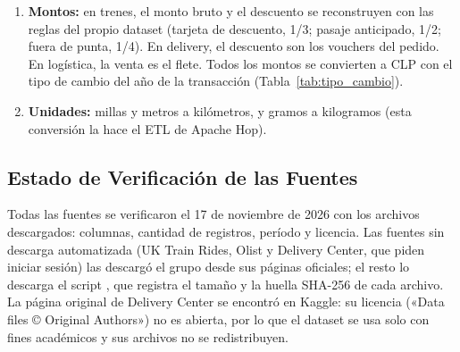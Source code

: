 \begin{enumerate}[leftmargin=*]
        carretera~\cite{sernac2024} se ajustó, por mínimos cuadrados, una
        tarifa por pasaje de 6.918 + 18,8~CLP por km en servicio básico (semi
        cama) y de 6.917 + 26,6~CLP por km en lujo (salón cama). La distancia
        por carretera entre municipios colombianos se estima con la distancia
        en línea recta entre sus coordenadas multiplicada por 1,21, la mediana
        de la razón entre la distancia por carretera y en línea recta de esas
        28 rutas.
  \item \textbf{Montos:} en trenes, el monto bruto y el descuento se
        reconstruyen con las reglas del propio dataset (tarjeta de descuento,
        1/3; pasaje anticipado, 1/2; fuera de punta, 1/4). En delivery, el
        descuento son los vouchers del pedido. En logística, la venta es el
        flete. Todos los montos se convierten a CLP con el tipo de cambio del
        año de la transacción (Tabla~\ref{tab:tipo_cambio}).
  \item \textbf{Unidades:} millas y metros a kilómetros, y gramos a
        kilogramos (esta conversión la hace el ETL de Apache Hop).
\end{enumerate}

\subsection{Estado de Verificación de las Fuentes}

Todas las fuentes se verificaron el 17 de noviembre de 2026 con los archivos
descargados: columnas, cantidad de registros, período y licencia. Las fuentes
sin descarga automatizada (UK Train Rides, Olist y Delivery Center, que piden
iniciar sesión) las descargó el grupo desde sus páginas oficiales; el resto lo
descarga el script , que registra el tamaño
y la huella SHA-256 de cada archivo. La página original de Delivery Center se
encontró en Kaggle: su licencia («Data files © Original Authors») no es
abierta, por lo que el dataset se usa solo con fines académicos y sus archivos
no se redistribuyen.
